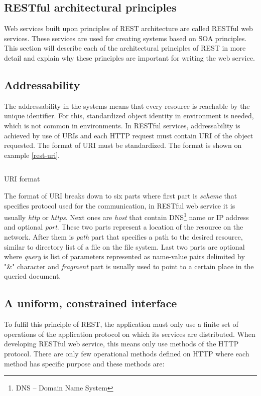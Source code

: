 \documentclass[12pt,final,oneside]{fithesis2}
\begin{document}
\subsection{RESTful architectural principles}
Web services built upon principles of REST architecture are called RESTful web services. These services are used for creating systems based on SOA principles. This section will describe each of the architectural principles of REST in more detail and explain why these principles are important for writing the web service.


\subsection*{Addressability}
The addressability in the systems means that every resource is reachable by the unique identifier. For this, standardized object identity in environment is needed, which is not common in environments. In RESTful services, addressability is achieved by use of URIs and each HTTP request must contain URI of the object requested. The format of URI must be standardized. The format is shown on example \ref{rest-uri}.

\begin{listing}[ht]
	\inputminted[]{bash}{sources/rest-uri.java}
	\caption{URI format}
	\label{rest-uri}
\end{listing}

The format of URI breaks down to six parts where first part is \textit{scheme} that specifies protocol used for the communication, in RESTful web service it is usually \textit{http} or \textit{https}. Next ones are \textit{host} that contain DNS\footnote{DNS -- Domain Name System} name or IP address and optional \textit{port}. These two parts represent a location of the resource on the network. After them is \textit{path} part that specifies a path to the desired resource, similar to directory list of a file on the file system. Last two parts are optional where \textit{query} is list of parameters represented as name-value pairs delimited by "\&" character and \textit{fragment} part is usually used to point to a certain place in the queried document.

\subsection*{A uniform, constrained interface}
To fulfil this principle of REST, the application must only use a finite set of operations of the application protocol on which its services are distributed. When developing RESTful web service, this means only use methods of the HTTP protocol. There are only few operational methods defined on HTTP where each method has specific purpose and these methods are:
\end{document}
